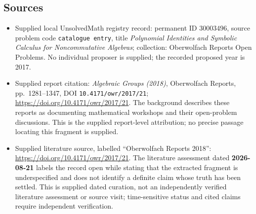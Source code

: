 \documentclass[11pt]{article}
\begin{document}
\subsection{Sources}
\begin{itemize}
\item Supplied local UnsolvedMath registry record: permanent ID \(30003496\), source problem code \texttt{catalogue entry}, title \emph{Polynomial Identities and Symbolic Calculus for Noncommutative Algebras}; collection: Oberwolfach Reports Open Problems. No individual proposer is supplied; the recorded proposed year is 2017.
\item Supplied report citation: \emph{Algebraic Groups (2018)}, Oberwolfach Reports, pp.\ 1281--1347, DOI \texttt{10.4171/owr/2017/21}; \url{https://doi.org/10.4171/owr/2017/21}. The background describes these reports as documenting mathematical workshops and their open-problem discussions. This is the supplied report-level attribution; no precise passage locating this fragment is supplied.
\item Supplied literature source, labelled ``Oberwolfach Reports 2018'': \url{https://doi.org/10.4171/owr/2017/21}. The literature assessment dated \textbf{2026-08-21} labels the record open while stating that the extracted fragment is underspecified and does not identify a definite claim whose truth has been settled. This is supplied dated curation, not an independently verified literature assessment or source visit; time-sensitive status and cited claims require independent verification.
\end{itemize}
\end{document}
